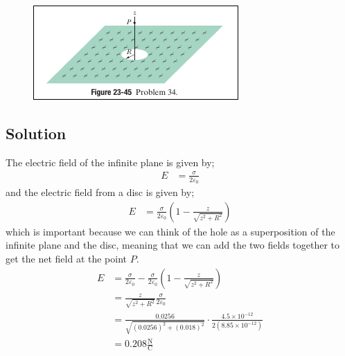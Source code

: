 \documentclass{article}
\newcommand{\N}{\text{N}}
\newcommand{\C}{\text{C}}
\begin{document}
\begin{figure}[ht]
    \centering
    \includegraphics[scale=0.75]{image-5.png}
\end{figure}

\subsection*{Solution}
The electric field of the infinite plane is given by;
\begin{align*}
    E &= \frac{\sigma}{2\varepsilon_0}
\end{align*}
and the electric field from a disc is given by;
\begin{align*}
    E &= \frac{\sigma}{2\varepsilon_0}\left(1 - \frac{z}{\sqrt{z^2 + R^2}}\right)
\end{align*}
which is important because we can think of the hole as a superposition of the infinite plane and the disc, meaning that we can add the two fields together to get the net field at the point $P$.
\begin{align*}
    E &= \frac{\sigma}{2\varepsilon_0} - \frac{\sigma}{2\varepsilon_0}\left(1 - \frac{z}{\sqrt{z^2 + R^2}}\right) \\
    &= \frac{z}{\sqrt{z^2 + R^2}}\frac{\sigma}{2\varepsilon_0} \\
    &= \frac{0.0256}{\sqrt{(0.0256)^2 + (0.018)^2}}\cdot\frac{4.5 \times 10^{-12}}{2\left(8.85 \times 10^{-12}\right)} \\
    &= \boxed{0.208 \frac{\N}{\C}}
\end{align*}

\end{document}
